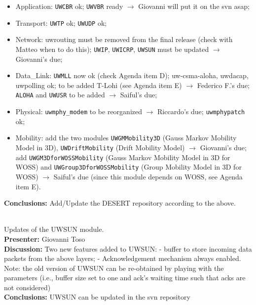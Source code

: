 \documentclass[11pt,journal,draftclsnofoot,onecolumn,twoside,letterpaper]{IEEEtran}
\theoremstyle{definition} \newtheorem{definition}[]{Definition}
\theoremstyle{theorem} \newtheorem{theorem}[]{Theorem}
\begin{document}
\begin{itemize}
 \item Application: {\tt UWCBR} ok; {\tt UWVBR} ready $\rightarrow$ Giovanni will put it on the svn asap;
 \item Transport: {\tt UWTP} ok; {\tt UWUDP} ok;
 \item Network: uwrouting must be removed from the final release (check with Matteo when to do this); {\tt UWIP}, {\tt UWICRP}, {\tt UWSUN} must be updated $\rightarrow$ Giovanni's due;
 \item Data\_Link: {\tt UWMLL} now ok (check Agenda item D); uw-csma-aloha, uwdacap, uwpolling ok; to be added T-Lohi (see Agenda item E) $\rightarrow$ Federico F.'s due; {\tt ALOHA} and {\tt UWUSR} to be added $\rightarrow$ Saiful's due;
 \item Physical: {\tt uwmphy\_modem} to be reorganized $\rightarrow$ Riccardo's due; {\tt uwmphypatch} ok;
 \item Mobility: add the two modules {\tt UWGMMobility3D} (Gauss Markov Mobility Model in 3D), {\tt UWDriftMobility} (Drift Mobility Model) $\rightarrow$ Giovanni's due; add {\tt UWGM3DforWOSSMobility} (Gauss Markov Mobility Model in 3D for WOSS) and {\tt UWGroup3DforWOSSMobility} (Group Mobility Model in 3D for WOSS) $\rightarrow$ Saiful's due (since this module depends on WOSS, see Agenda item E).
\end{itemize}
{\bf Conclusions:}  Add/Update the DESERT repository according to the above.


\  \\
 Updates of the UWSUN module.\\
{\bf Presenter:} Giovanni Toso\\
{\bf Discussion:} Two new features added to UWSUN:
- buffer to store incoming data packets from the above layers;
- Acknowledgement mechanism always enabled.
Note: the old version of UWSUN can be re-obtained by playing with the parameters (i.e., buffer size set to one and ack's waiting time such that acks are not considered)\\
{\bf Conclusions:}  UWSUN can be updated in the svn repository
\end{document}
